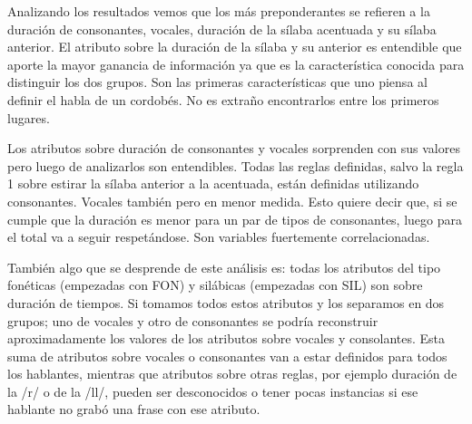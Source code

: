 Analizando los resultados vemos que los más preponderantes se refieren a la duración de consonantes, vocales, duración de la sílaba acentuada y su sílaba anterior. El atributo sobre la duración de la sílaba y su anterior es entendible que aporte la mayor ganancia de información ya que es la característica conocida para distinguir los dos grupos. Son las primeras características que uno piensa al definir el habla de un cordobés. No es extraño encontrarlos entre los primeros lugares. 

Los atributos sobre duración de consonantes y vocales sorprenden con sus valores pero luego de analizarlos son entendibles. Todas las reglas definidas, salvo la regla 1 sobre estirar la sílaba anterior a la acentuada, están definidas utilizando consonantes. Vocales también pero en menor medida. Esto quiere decir que, si se cumple que la duración es menor para un par de tipos de consonantes, luego para el total va a seguir respetándose. Son variables fuertemente correlacionadas.

También algo que se desprende de este análisis es: todas los atributos del tipo fonéticas (empezadas con FON) y silábicas (empezadas con SIL) son sobre duración de tiempos. Si tomamos todos estos atributos y los separamos en dos grupos; uno de vocales y otro de consonantes se podría reconstruir aproximadamente los valores de los atributos sobre vocales y consolantes. Esta suma de atributos sobre vocales o consonantes van a estar definidos para todos los hablantes, mientras que atributos sobre otras reglas, por ejemplo duración de la /r/ o de la /ll/, pueden ser desconocidos o tener pocas instancias si ese hablante no grabó una frase con ese atributo. 



